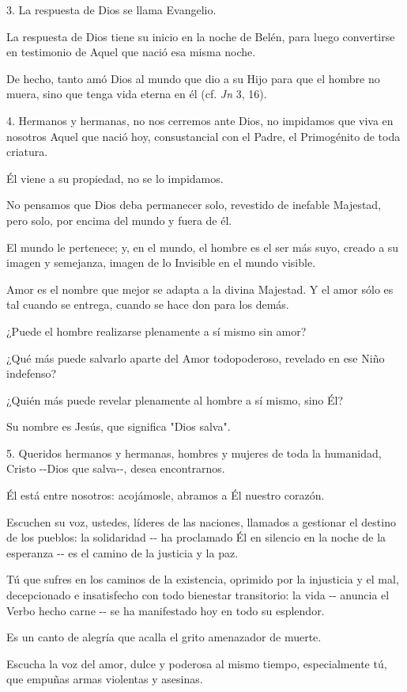 \begin{body}
\begin{body}
3. La respuesta de Dios se llama Evangelio.

La respuesta de Dios tiene su inicio en la noche de Belén, para luego convertirse en testimonio de Aquel que nació esa misma noche.

De hecho, tanto amó Dios al mundo que dio a su Hijo para que el hombre no muera, sino que tenga vida eterna en él (cf. \emph{Jn} 3, 16).

4. Hermanos y hermanas, no nos cerremos ante Dios, no impidamos que viva en nosotros Aquel que nació hoy, consustancial con el Padre, el Primogénito de toda criatura.

Él viene a su propiedad, no se lo impidamos.

No pensamos que Dios deba permanecer solo, revestido de inefable Majestad, pero solo, por encima del mundo y fuera de él.

El mundo le pertenece; y, en el mundo, el hombre es el ser más suyo, creado a su imagen y semejanza, imagen de lo Invisible en el mundo visible.

Amor es el nombre que mejor se adapta a la divina Majestad. Y el amor sólo es tal cuando se entrega, cuando se hace don para los demás.

¿Puede el hombre realizarse plenamente a sí mismo sin amor?

¿Qué más puede salvarlo aparte del Amor todopoderoso, revelado en ese Niño indefenso?

¿Quién más puede revelar plenamente al hombre a sí mismo, sino Él?

Su nombre es Jesús, que significa "Dios salva".

5. Queridos hermanos y hermanas, hombres y mujeres de toda la humanidad, Cristo -\/-Dios que salva-\/-, desea encontrarnos.

Él está entre nosotros: acojámosle, abramos a Él nuestro corazón.

Escuchen su voz, ustedes, líderes de las naciones, llamados a gestionar el destino de los pueblos: la solidaridad -\/- ha proclamado Él en silencio en la noche de la esperanza -\/- es el camino de la justicia y la paz.

Tú que sufres en los caminos de la existencia, oprimido por la injusticia y el mal, decepcionado e insatisfecho con todo bienestar transitorio: la vida -\/- anuncia el Verbo hecho carne -\/- se ha manifestado hoy en todo su esplendor.

Es un canto de alegría que acalla el grito amenazador de muerte.

Escucha la voz del amor, dulce y poderosa al mismo tiempo, especialmente tú, que empuñas armas violentas y asesinas.


\end{body}
\end{body}
